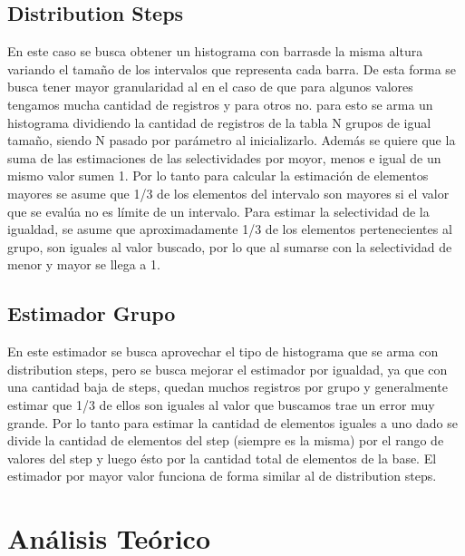 \documentclass[a4paper, 10pt, twoside]{article}
\begin{document}
\subsection{Distribution Steps}

En este caso se busca obtener un histograma con barrasde la misma altura variando el
tamaño de los intervalos que representa cada barra. De esta forma se busca tener mayor
 granularidad al en el caso de que para algunos valores tengamos mucha cantidad de
 registros y para otros no. para esto se arma un histograma dividiendo la cantidad de
 registros de la tabla N grupos de igual tamaño, siendo N pasado por parámetro al
 inicializarlo. Además se quiere que la suma de las estimaciones de las selectividades
 por moyor, menos e igual de un mismo valor sumen 1.
Por lo tanto para calcular la estimación de elementos mayores se asume que 1/3 de los
elementos del intervalo son mayores si el valor que se evalúa no es límite de un
intervalo. Para estimar la selectividad de la igualdad, se asume que aproximadamente
 1/3 de los elementos pertenecientes al grupo, son iguales al valor buscado,
 por lo que al sumarse con la selectividad de menor y mayor se llega a 1.

\subsection{Estimador Grupo}

En este estimador se busca aprovechar el tipo de histograma que se arma con distribution steps,
pero se busca mejorar el estimador por igualdad, ya que con una cantidad baja de steps, quedan muchos registros por
grupo y generalmente estimar que 1/3 de ellos son iguales al valor que buscamos trae un error muy grande.
Por lo tanto para estimar la cantidad de elementos iguales a uno dado se divide la cantidad de elementos del step
(siempre es la misma) por el rango de valores del step y luego ésto por la cantidad total de elementos de la base.
El estimador por mayor valor funciona de forma similar al de distribution steps.



\section{Análisis Teórico}
\end{document}
